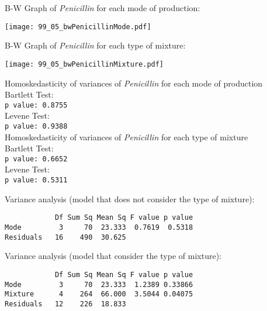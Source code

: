 \begin{frame}
  B-W Graph of \textit{Penicillin} for each mode of production:\\
  \vspace{-0.5cm}
  \begin{center}
    \texttt{[image: 99\_05\_bwPenicillinMode.pdf]}
  \end{center}
\end{frame}

\begin{frame}
  B-W Graph of \textit{Penicillin} for each type of mixture:\\
  \vspace{-0.5cm}
  \begin{center}
    \texttt{[image: 99\_05\_bwPenicillinMixture.pdf]}
  \end{center}
\end{frame}

\begin{frame}
  Homoskedasticity of variances of \textit{Penicillin} for each mode of production\\
  \vspace*{0.25cm}
  Bartlett Test:\\
  \texttt{p value: 0.8755}\\
  \vspace*{0.25cm}
  Levene Test:\\
  \texttt{p value: 0.9388}\\
  \vspace*{0.75cm}
  Homoskedasticity of variances of \textit{Penicillin} for each type of mixture\\
  \vspace*{0.25cm}
  Bartlett Test:\\
  \texttt{p value: 0.6652}\\
  \vspace*{0.25cm}
  Levene Test:\\
  \texttt{p value: 0.5311}\\
\end{frame}

\begin{frame}[fragile]
  \vspace{0.25cm}
  Variance analysis (model that does not consider the type of mixture):
  \begin{verbatim}  
            Df Sum Sq Mean Sq F value p value
Mode         3     70  23.333  0.7619  0.5318
Residuals   16    490  30.625     
  \end{verbatim}
  \vspace{0.25cm}
  Variance analysis (model that consider the type of mixture):
  \begin{verbatim}  
            Df Sum Sq Mean Sq F value p value  
Mode         3     70  23.333  1.2389 0.33866  
Mixture      4    264  66.000  3.5044 0.04075
Residuals   12    226  18.833     
  \end{verbatim}
\end{frame}

